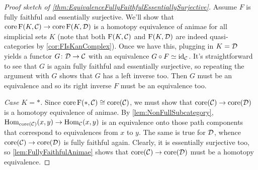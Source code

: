 \begin{proof}[Proof sketch of \cref{thm:EquivalenceFullyFaithfulEssentiallySurjective}]
	Assume $F$ is fully faithful and essentially surjective. We'll show that $\operatorname{core} \operatorname{F}(K,\mathcal{C})\rightarrow\operatorname{core}\operatorname{F}(K,\mathcal{D})$ is a homotopy equivalence of animae for all simplicial sets $K$ (note that both $\operatorname{F}(K,\mathcal{C})$ and $\operatorname{F}(K,\mathcal{D})$ are indeed quasi-categories by \cref{cor:FIsKanComplex}). Once we have this, plugging in $K=\mathcal{D}$ yields a functor $G\colon \mathcal{D}\rightarrow\mathcal{C}$ with an equivalence $G\circ F\simeq\operatorname{id}_{\mathcal{C}}$. It's straightforward to see that $G$ is again fully faithful and essentially surjective, so repeating the argument with $G$ shows that $G$ has a left inverse too. Then $G$ must be an equivalence and so its right inverse $F$ must be an equivalence too.
	
	\emph{Case $K=*$.} Since $\operatorname{core} \operatorname{F}(*,\mathcal{C})\cong \operatorname{core}(\mathcal{C})$, we must show that $\operatorname{core}(\mathcal{C})\rightarrow\operatorname{core}(\mathcal{D})$ is a homotopy equivalence of animae. By \cref{lem:NonFullSubcategory}, $\operatorname{Hom}_{\operatorname{core} (\mathcal{C})}(x,y)\rightarrow \operatorname{Hom}_{\mathcal{C}}(x,y)$ is an equivalence onto those path components that correspond to equivalences from $x$ to $y$. The same is true for $\mathcal{D}$, whence $\operatorname{core} (\mathcal{C})\rightarrow\operatorname{core}(\mathcal{D})$ is fully faithful again. Clearly, it is essentially surjective too, so \cref{lem:FullyFaithfulAnimae} shows that $\operatorname{core} (\mathcal{C})\rightarrow\operatorname{core}(\mathcal{D})$ must be a homotopy equivalence.
	

\end{proof}
